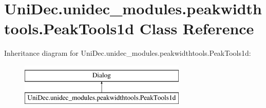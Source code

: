 \hypertarget{class_uni_dec_1_1unidec__modules_1_1peakwidthtools_1_1_peak_tools1d}{}\section{Uni\+Dec.\+unidec\+\_\+modules.\+peakwidthtools.\+Peak\+Tools1d Class Reference}
\label{class_uni_dec_1_1unidec__modules_1_1peakwidthtools_1_1_peak_tools1d}
Inheritance diagram for Uni\+Dec.\+unidec\+\_\+modules.\+peakwidthtools.\+Peak\+Tools1d\+:\begin{figure}[H]
\begin{center}
\leavevmode
\includegraphics[height=2.000000cm]{class_uni_dec_1_1unidec__modules_1_1peakwidthtools_1_1_peak_tools1d}
\end{center}
\end{figure}
